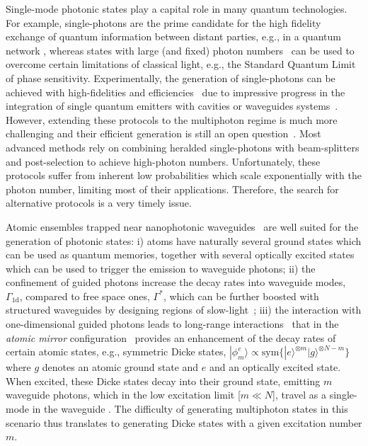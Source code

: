 \documentclass[twocolumn,pra,aps,superscriptaddress,showpacs]{revtex4-1}
\newcommand{\ket}[1]{|#1\rangle}
\def\oned{\mathrm{1d}}
\begin{document}
Single-mode photonic states play a capital role in many quantum technologies. For example, single-photons are the prime candidate for the high fidelity exchange of quantum information between distant parties, e.g., in a quantum network \cite{kimble08a}, whereas states with large (and fixed) photon numbers~\cite{caves81,holland93,giovannetti04a} can be used to overcome certain limitations of classical light, e.g., the Standard Quantum Limit of phase sensitivity. Experimentally, the generation of single-photons can be achieved with high-fidelities and efficiencies~\cite{lounis05a} due to impressive progress in the integration of single quantum emitters with cavities or waveguides systems~\cite{xu99a,painter99a,hughes04a,rao07a,laucht12a,arcari14a,somaschi16a,reiserer15}. However, extending these protocols to the multiphoton regime is much more challenging and their efficient generation is still an open question~\cite{dellanno06}. Most advanced methods \cite{wang16a} rely on combining heralded single-photons with beam-splitters 
and post-selection to achieve high-photon numbers. Unfortunately, these protocols suffer from inherent low probabilities which scale exponentially with the photon number, limiting most of their applications. Therefore, the search for alternative protocols is a very timely issue.

Atomic ensembles trapped near nanophotonic waveguides~\cite{vetsch10a,goban13a,beguin14a,goban15a,sorensen16a,corzo16a,solano17} are well suited for the generation of photonic states: 
i) atoms have naturally several ground states which can be used as quantum memories, together with several optically excited states which can be used to trigger the emission to waveguide photons; 
ii) the confinement of guided photons increase the decay rates into waveguide modes, $\Gamma_{\oned}$, compared to free space ones, $\Gamma^*$, which can be further boosted with structured waveguides by designing regions of slow-light~\cite{goban13a,goban15a,laucht12a,lodahl15};
iii) the interaction with one-dimensional guided photons leads to long-range interactions~\cite{kien05a} that in the \emph{atomic mirror} configuration~\cite{chang12a,sorensen16a,corzo16a} provides an enhancement of the decay rates of certain atomic states, e.g.,  symmetric Dicke states, $\ket{\phi^e_m} \propto \mathrm{sym}\{ \ket{e}^{\otimes m} \ket{g}^{\otimes N-m}\}$ where $g$ denotes an atomic ground state and $e$ and an optically excited state.
When excited, these Dicke states decay into their ground state, emitting $m$ waveguide photons, which in the low excitation limit [$m\ll N$], travel as a single-mode in the waveguide \cite{porras08a,gonzaleztudela15a}. The difficulty of generating multiphoton states in this scenario thus translates to generating Dicke states with a given excitation number $m$.
\end{document}
